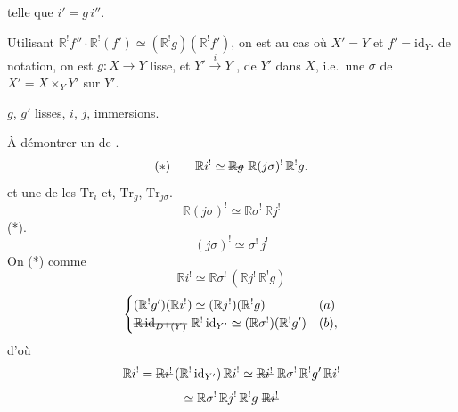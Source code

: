\documentclass[11pt,a4paper]{article}
\begin{document}
telle que $i' = g\, i''$.

Utilisant $\mathbb{R}^! f'' \cdot \mathbb{R}^! (f') \simeq (\mathbb{R}^! g)(\mathbb{R}^! f')$,
on est  au cas où $X' = Y$ et $f' = \mathrm{id}_Y$.
 de notation, on est  \ill{}
\ill{} \ill{} $g : X \to Y$ lisse, et $Y' \xrightarrow{\;i\;} Y$
\ill{},  \ill{} \ill{} \ill{} \struck{\ill{}} \ill{}
\ill{} de $Y'$ dans $X$, i.e.\ une  $\sigma$ de
$X' = X \times_Y Y'$ sur $Y'$.


$g$, $g'$ lisses, $i$, $j$, \struck{$\sigma$} immersions.

À \struck{\ill{}} démontrer un  de .
\[
  (*) \qquad \mathbb{R}i^! \simeq \text{\struck{$\mathbb{R}g$}}\ \mathbb{R}(j\sigma)^!\, \mathbb{R}^! g .
\]
et une  de  \ill{} \ill{}
 les $\mathrm{Tr}_i$ et, $\mathrm{Tr}_g$, $\mathrm{Tr}_{j\sigma}$.
\[
  \mathbb{R}(j\sigma)^! \simeq \mathbb{R}\sigma^!\, \mathbb{R}j^!
\]
 (*).
\[
  (j\sigma)^! \simeq \sigma^!\, j^!
\]
On \ill{} (*) comme \struck{\ill{}}
\[
  \mathbb{R}i^! \simeq \mathbb{R}\sigma^!\,(\mathbb{R}j^!\, \mathbb{R}^! g)
\]
   
\[
  \begin{cases}
    (\mathbb{R}^! g')(\mathbb{R}i^!) \simeq (\mathbb{R}j^!)(\mathbb{R}^! g) & (a)\\
    \text{\struck{$\mathbb{R}\,\mathrm{id}_{D^+(Y)}$}}\ \mathbb{R}^!\,\mathrm{id}_{Y'} \simeq (\mathbb{R}\sigma^!)(\mathbb{R}^! g') & (b),
  \end{cases}
\]
d'où
\[
  \mathbb{R}i^! = \text{\struck{$\mathbb{R}i^!$}}\,(\mathbb{R}^!\,\mathrm{id}_{Y'})\,\mathbb{R}i^!
  \simeq \text{\struck{$\mathbb{R}i^!$}}\ \mathbb{R}\sigma^!\, \mathbb{R}^! g'\, \mathbb{R}i^!
\]
\[
  \simeq \mathbb{R}\sigma^!\,\mathbb{R}j^!\,\mathbb{R}^! g\ \text{\struck{$\mathbb{R}i^!$}}
\]
\end{document}
